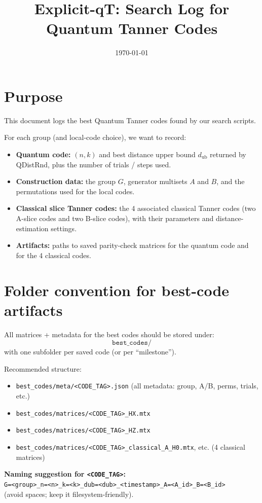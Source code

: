 \documentclass[11pt]{article}
\title{Explicit-qT: Search Log for Quantum Tanner Codes}
\author{}
\date{\today}
\begin{document}
\maketitle

\section{Purpose}
This document logs the best Quantum Tanner codes found by our search scripts.

For each group (and local-code choice), we want to record:
\begin{itemize}
  \item \textbf{Quantum code:} $(n,k)$ and best distance upper bound $d_{\mathrm{ub}}$ returned by QDistRnd, plus the number of trials / steps used.
  \item \textbf{Construction data:} the group $G$, generator multisets $A$ and $B$, and the permutations used for the local codes.
  \item \textbf{Classical slice Tanner codes:} the 4 associated classical Tanner codes (two A-slice codes and two B-slice codes), with their parameters and distance-estimation settings.
  \item \textbf{Artifacts:} paths to saved parity-check matrices for the quantum code and for the 4 classical codes.
\end{itemize}

\section{Folder convention for best-code artifacts}
All matrices + metadata for the best codes should be stored under:
\[
\texttt{best\_codes/}
\]
with one subfolder per saved code (or per ``milestone'').

Recommended structure:
\begin{itemize}
  \item \texttt{best\_codes/meta/<CODE\_TAG>.json} (all metadata: group, A/B, perms, trials, etc.)
  \item \texttt{best\_codes/matrices/<CODE\_TAG>\_HX.mtx}
  \item \texttt{best\_codes/matrices/<CODE\_TAG>\_HZ.mtx}
  \item \texttt{best\_codes/matrices/<CODE\_TAG>\_classical\_A\_H0.mtx}, etc. (4 classical matrices)
\end{itemize}

\noindent \textbf{Naming suggestion for \texttt{<CODE\_TAG>}:}\\
\texttt{G=<group>\_n=<n>\_k=<k>\_dub=<dub>\_<timestamp>\_A=<A\_id>\_B=<B\_id>}\\
(avoid spaces; keep it filesystem-friendly).
\end{document}
